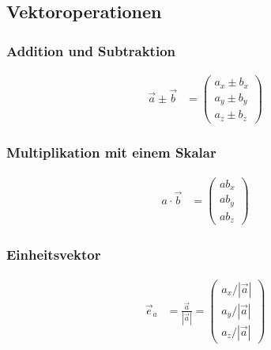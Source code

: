 \newpage
\subsection{Vektoroperationen}
\begin{multicols}{2}
\subsubsection*{Addition und Subtraktion}
\begin{align*} 
\vec{a}\pm\vec{b}&= \begin{pmatrix}a_x\pm b_x\\a_y\pm b_y\\a_z\pm b_z\end{pmatrix}
\end{align*}
\vfill
\subsubsection*{Multiplikation mit einem Skalar}
\begin{align*} 
a\cdot\vec{b}&= \begin{pmatrix}ab_x\\ ab_y\\ab_z\end{pmatrix}
\end{align*}
\vfill
\end{multicols}

\subsubsection*{Einheitsvektor}
\begin{align*} 
\vec{e}_a&=\frac{\vec{a}}{|\vec{a}|}= \begin{pmatrix}a_x/|\vec{a}|\\ a_y/|\vec{a}|\\a_z/|\vec{a}|\end{pmatrix}
\end{align*}

